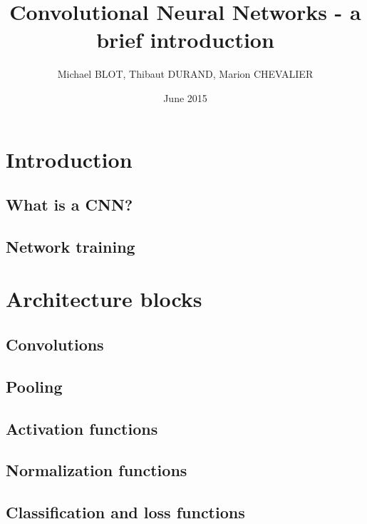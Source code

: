 \documentclass{report}
\title{Convolutional Neural Networks - a brief introduction}
\author{Michael BLOT, Thibaut DURAND, Marion CHEVALIER}
\date{June 2015}
\begin{document}
%
\maketitle

\tableofcontents




\chapter{Introduction}

\section{What is a CNN?}


\section{Network training}




\chapter{Architecture blocks}
\label{blocks}



\section{Convolutions}


\section{Pooling}


\section{Activation functions}


\section{Normalization functions}


\section{Classification and loss functions}

\end{document}
